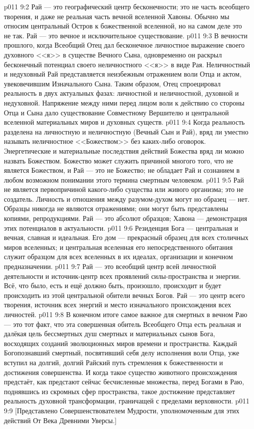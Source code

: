 \vs p011 9:2 \pc Рай --- это географический центр бесконечности; это не часть всеобщего творения, и даже не реальная часть вечной вселенной Хавоны. Обычно мы относим центральный Остров к божественной вселенной, но на самом деле это не так. Рай --- это вечное и исключительное существование.
\vs p011 9:3 \pc В вечности прошлого, когда Всеобщий Отец дал бесконечное личностное выражение своего духовного <<я>> в существе Вечного Сына, одновременно он раскрыл бесконечный потенциал своего неличностного <<я>> в виде Рая. Неличностный и недуховный Рай представляется неизбежным отражением воли Отца и актом, увековечившим Изначального Сына. Таким образом, Отец спроецировал реальность в двух актуальных фазах: личностной и неличностной, духовной и недуховной. Напряжение между ними перед лицом воли к действию со стороны Отца и Сына дало существование Совместному Вершителю и центральной вселенной материальных миров и духовных существ.
\vs p011 9:4 Когда реальность разделена на личностную и неличностную (Вечный Сын и Рай), вряд ли уместно называть неличностное <<Божеством>> без каких\hyp{}либо оговорок. Энергетические и материальные последствия действий Божества вряд ли можно назвать Божеством. Божество может служить причиной многого того, что не является Божеством, и Рай --- это не Божество; не обладает Рай и сознанием в любом возможном понимании этого термина смертным человеком.
\vs p011 9:5 \pc Рай не является первопричиной какого\hyp{}либо существа или живого организма; это не создатель. Личность и отношения между разумом\hyp{}духом могут  но образец --- нет. Образцы никогда не являются отражениями; они могут быть представлены копиями, репродукциями. Рай --- это абсолют образцов; Хавона --- демонстрация этих потенциалов в актуальности.
\vs p011 9:6 \pc Резиденция Бога --- центральная и вечная, славная и идеальная. Его дом --- прекрасный образец для всех столичных миров вселенных; и центральная вселенная его непосредственного обитания служит образцом для всех вселенных в их идеалах, организации и конечном предназначении.
\vs p011 9:7 Рай --- это всеобщий центр всей личностной деятельности и источник\hyp{}центр всех проявлений силы\hyp{}пространства и энергии. Всё, что было, есть и ещё должно быть, произошло, происходит и будет происходить из этой центральной обители вечных Богов. Рай --- это центр всего творения, источник всех энергий и место изначального происхождения всех личностей.
\vs p011 9:8 \pc В конечном итоге самое важное для смертных в вечном Раю --- это тот факт, что эта совершенная обитель Всеобщего Отца есть реальная и далёкая цель бессмертных душ смертных и материальных сынов Бога, восходящих созданий эволюционных миров времени и пространства. Каждый Богопознавший смертный, посвятивший себя делу исполнения воли Отца, уже вступил на долгий, долгий Райский путь стремления к божественности и достижения совершенства. И когда такое существо животного происхождения предстаёт, как предстают сейчас бесчисленные множества, перед Богами в Раю, поднявшись из скромных сфер пространства, такое достижение представляет реальность духовной трансформации, граничащей с пределами верховности.
\vsetoff
\vs p011 9:9 [Представлено Совершенствователем Мудрости, уполномоченным для этих действий От Века Древними Уверсы.]
\quizlink
